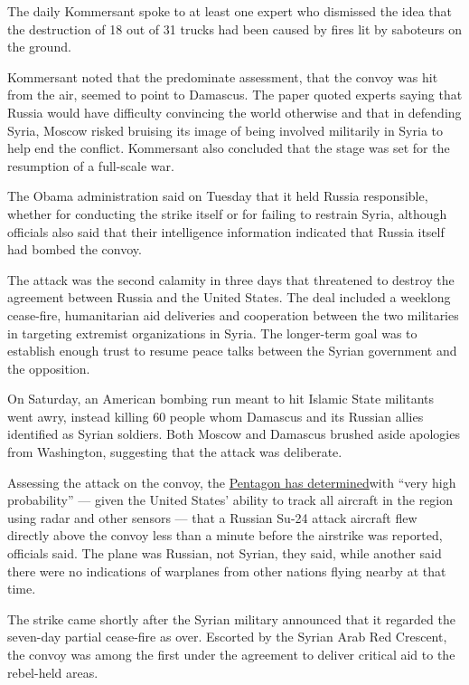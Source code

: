 The daily Kommersant spoke to at least one expert who dismissed the idea
that the destruction of 18 out of 31 trucks had been caused by fires lit
by saboteurs on the ground.

Kommersant noted that the predominate assessment, that the convoy was
hit from the air, seemed to point to Damascus. The paper quoted experts
saying that Russia would have difficulty convincing the world otherwise
and that in defending Syria, Moscow risked bruising its image of being
involved militarily in Syria to help end the conflict. Kommersant also
concluded that the stage was set for the resumption of a full-scale war.

The Obama administration said on Tuesday that it held Russia
responsible, whether for conducting the strike itself or for failing to
restrain Syria, although officials also said that their intelligence
information indicated that Russia itself had bombed the convoy.

The attack was the second calamity in three days that threatened to
destroy the agreement between Russia and the United States. The deal
included a weeklong cease-fire, humanitarian aid deliveries and
cooperation between the two militaries in targeting extremist
organizations in Syria. The longer-term goal was to establish enough
trust to resume peace talks between the Syrian government and the
opposition.

On Saturday, an American bombing run meant to hit Islamic State
militants went awry, instead killing 60 people whom Damascus and its
Russian allies identified as Syrian soldiers. Both Moscow and Damascus
brushed aside apologies from Washington, suggesting that the attack was
deliberate.

Assessing the attack on the convoy, the
\href{http://www.nytimes.com/2016/09/21/world/middleeast/syria-cease-fire.html}{Pentagon
has determined}with ``very high probability'' --- given the United
States' ability to track all aircraft in the region using radar and
other sensors --- that a Russian Su-24 attack aircraft flew directly
above the convoy less than a minute before the airstrike was reported,
officials said. The plane was Russian, not Syrian, they said, while
another said there were no indications of warplanes from other nations
flying nearby at that time.

The strike came shortly after the Syrian military announced that it
regarded the seven-day partial cease-fire as over. Escorted by the
Syrian Arab Red Crescent, the convoy was among the first under the
agreement to deliver critical aid to the rebel-held areas.

